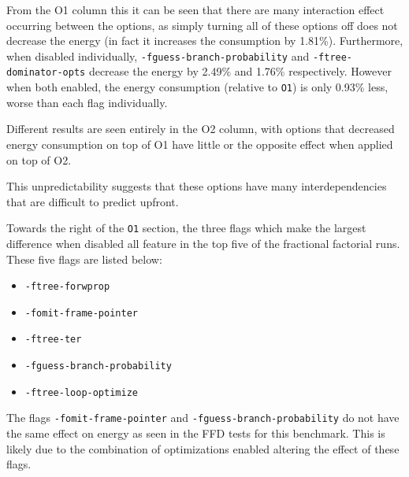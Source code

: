 \documentclass[twocolumn]{article}
\begin{document}
From the O1 column this it can be seen that there are many interaction effect occurring between the options, as simply turning all of these options off does not decrease the energy (in fact it increases the consumption by 1.81\%). Furthermore, when disabled individually, \texttt{-fguess-branch-probability} and \texttt{-ftree-dominator-opts} decrease the energy by 2.49\% and 1.76\% respectively. However when both enabled, the energy consumption (relative to \texttt{O1}) is only 0.93\% less, worse than each flag individually.

Different results are seen entirely in the O2 column, with options that decreased energy consumption on top of O1 have little or the opposite effect when applied on top of O2.

This unpredictability suggests that these options have many interdependencies that are difficult to predict upfront.

Towards the right of the \texttt{O1} section, the three flags which make the largest difference when disabled all feature in the top five of the fractional factorial runs. These five flags are listed below:
\begin{itemize}
	\setlength{\itemsep}{0em}
	\vspace{-1mm}
	\item \texttt{-ftree-forwprop}
	\item \texttt{-fomit-frame-pointer}
	\item \texttt{-ftree-ter}
	\item \texttt{-fguess-branch-probability}
	\item \texttt{-ftree-loop-optimize}
\end{itemize}

The flags \texttt{-fomit-frame-pointer} and \texttt{-fguess-branch-probability} do not have the same effect on energy as seen in the FFD tests for this benchmark. This is likely due to the combination of optimizations enabled altering the effect of these flags.
\end{document}
